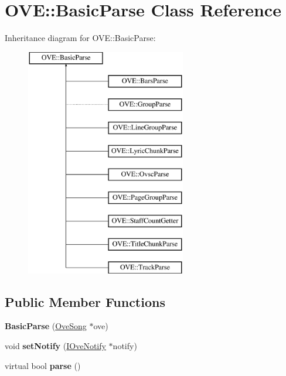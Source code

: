 \hypertarget{class_o_v_e_1_1_basic_parse}{}\section{O\+VE\+:\+:Basic\+Parse Class Reference}
\label{class_o_v_e_1_1_basic_parse}
Inheritance diagram for O\+VE\+:\+:Basic\+Parse\+:\begin{figure}[H]
\begin{center}
\leavevmode
\includegraphics[height=10.000000cm]{class_o_v_e_1_1_basic_parse}
\end{center}
\end{figure}
\subsection*{Public Member Functions}
\begin{DoxyCompactItemize}
\item 
\mbox{\label{class_o_v_e_1_1_basic_parse_a714561a00e17943f075ce4d0b44f5986}} 
{\bfseries Basic\+Parse} (\hyperlink{class_o_v_e_1_1_ove_song}{Ove\+Song} $\ast$ove)
\item 
\mbox{\label{class_o_v_e_1_1_basic_parse_a0acfb80499d02af56d94b28b46b744f0}} 
void {\bfseries set\+Notify} (\hyperlink{class_o_v_e_1_1_i_ove_notify}{I\+Ove\+Notify} $\ast$notify)
\item 
\mbox{\label{class_o_v_e_1_1_basic_parse_a343f9c797c788b328bf9b75955863198}} 
virtual bool {\bfseries parse} ()
\end{DoxyCompactItemize}
